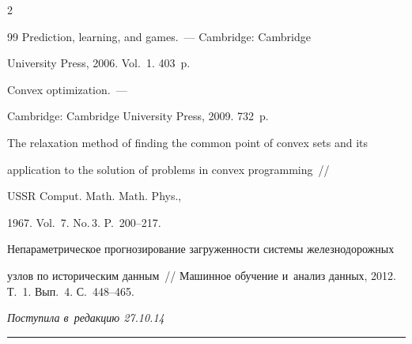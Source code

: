 \begin{multicols}{2}
{{\begin{thebibliography}{99}
 Prediction, learning, and games.~--- Cambridge: Cambridge

    University Press, 2006. Vol.~1. 403~p.




 Convex optimization.~---

Cambridge: Cambridge University Press, 2009. 732~p.




 The relaxation method of finding the common point of convex sets and its

    application to the solution of problems in convex programming~//

    USSR Comput. Math. Math. Phys.,

    1967. Vol.~7. No.\,3. P.~200--217.




 Непараметрическое прогнозирование загруженности системы железнодорожных

    узлов по историческим данным~// Машинное обучение и~анализ данных, 2012. Т.~1. Вып.~4. С.~448--465.

     \end{thebibliography}



 }

 }



\end{multicols}



\vspace*{-3pt}



\hfill{\small\textit{Поступила в~редакцию 27.10.14}}






\vspace*{12pt}



\hrule



\vspace*{2pt}



